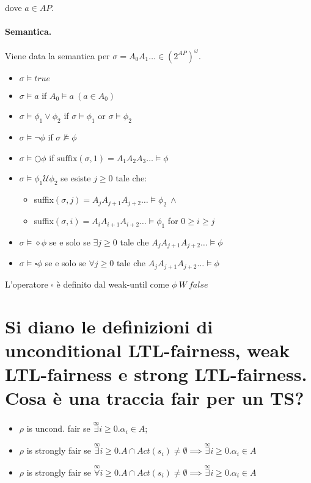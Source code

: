 \documentclass[a4paper,11pt]{article}
\newcommand{\until}{\mathcal{U}}
\begin{document}
	dove $a \in AP$.

	\newpage
	\paragraph{Semantica.} Viene data la semantica per $\sigma = A_0A_1 \dots \in (2^{AP})^\omega$.

	\begin{itemize}
		\item $\sigma \models true$
		\item $\sigma \models a$ if $A_0 \models a\ (a \in A_0)$
		\item $\sigma \models \phi_1 \vee \phi_2 $ if $\sigma \models \phi_1$ or $\sigma \models \phi_2$
		\item $\sigma \models \neg\phi$ if $\sigma \not\models \phi$
		\item $\sigma \models \bigcirc	\phi$ if $\text{suffix}(\sigma, 1) = A_1A_2A_3 \dots \models \phi$
		\item $\sigma \models \phi_1 \until \phi_2$ se esiste $j\geq 0$ tale che:\begin{itemize}
			\item suffix$(\sigma, j) = A_jA_{j+1}A_{j+2} \dots \models \phi_2\ \wedge$
			\item suffix$(\sigma, i) = A_iA_{i+1}A_{i+2} \dots \models \phi_1$ for $0 \geq i \geq j$
		\end{itemize}
		\item $\sigma \models \diamond \phi$ se e solo se $\exists j\geq 0$ tale che $A_jA_{j+1}A_{j+2} \dots \models \phi$
		\item  $\sigma \models \square \phi $ se e solo se $\forall j\geq 0$ tale che $A_jA_{j+1}A_{j+2} \dots \models \phi$
	\end{itemize}

	L'operatore $\square$ è  definito dal weak-until come $\phi\ W\ false$

	\section{Si diano le definizioni di unconditional LTL-fairness, weak LTL-fairness e strong LTL-fairness. Cosa è una traccia fair per un TS?}

	\begin{itemize}
		\item $\rho$ is uncond. fair se $\overset{\infty}{\exists} i \geq 0 . \alpha_i \in A$;
		\item $\rho$ is strongly fair se $\overset{\infty}{\exists} i \geq 0. A \cap Act(s_i) \neq \emptyset \implies \overset{\infty}{\exists} i \geq 0. \alpha_i \in A$
		\item $\rho$ is strongly fair se $\overset{\infty}{\forall} i \geq 0. A \cap Act(s_i) \neq \emptyset \implies \overset{\infty}{\exists} i \geq 0. \alpha_i \in A$
	\end{itemize}
\end{document}
